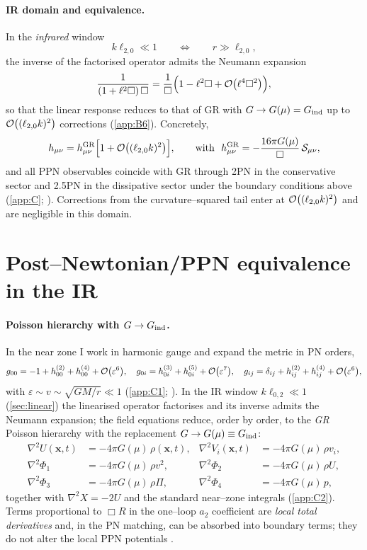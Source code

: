 \documentclass{iopjournal}
\begin{document}
\paragraph{IR domain and equivalence.}
In the \emph{infrared} window
\begin{equation}
k\ell_{2,0}\ll1\qquad\Longleftrightarrow\qquad r\gg \ell_{2,0},
\label{eq:lin_IRwindow}
\end{equation}
the inverse of the factorised operator admits the Neumann expansion
\[
\frac{1}{(1+\ell^2\Box)\,\Box}=\frac{1}{\Box}\Big(1-\ell^2\Box+\order{\ell^4\Box^2}\Big),
\]
so that the linear response reduces to that of GR with $G\to G(\mu)=G_{\rm ind}$ up to $\order{(\ell_{2,0}k)^2}$ corrections (\cref{app:B6}). Concretely,
\begin{equation}
h_{\mu\nu}=h_{\mu\nu}^{\rm GR}\Big[1+\order{(\ell_{2,0}k)^2}\Big],\qquad
\text{with}\ \ h_{\mu\nu}^{\rm GR}=-\frac{16\pi G(\mu)}{\Box}\,\mathcal S_{\mu\nu},
\label{eq:lin_equivalence}
\end{equation}
and all PPN observables coincide with GR through 2PN in the conservative sector and 2.5PN in the dissipative sector under the boundary conditions above (\cref{app:C}; \cite{PoissonWill2014,Will2014LRR,Blanchet2014LRR}). Corrections from the curvature–squared tail enter at $\order{(\ell_{2,0}k)^2}$ and are negligible in this domain.

\section{Post–Newtonian/PPN equivalence in the IR}\label{sec:ppn}
\paragraph{Poisson hierarchy with $G\to G_{\rm ind}$.}
In the near zone I work in harmonic gauge and expand the metric in PN orders,
\[
g_{00}=-1+h_{00}^{(2)}+h_{00}^{(4)}+\order{\varepsilon^{6}},\quad
g_{0i}=h_{0i}^{(3)}+h_{0i}^{(5)}+\order{\varepsilon^{7}},\quad
g_{ij}=\delta_{ij}+h_{ij}^{(2)}+h_{ij}^{(4)}+\order{\varepsilon^{6}},
\]
with $\varepsilon\sim v\sim\sqrt{GM/r}\ll1$ (\cref{app:C1}; \cite{PoissonWill2014,Blanchet2014LRR}). In the IR window $k\ell_{0,2}\ll1$ (\cref{sec:linear}) the linearised operator factorises and its inverse admits the Neumann expansion; the field equations reduce, order by order, to the \emph{GR} Poisson hierarchy with the replacement $G\to G(\mu)\equiv G_{\rm ind}$:
\begin{align}
\nabla^2 U(\boldsymbol x,t)&=-4\pi G(\mu)\,\rho(\boldsymbol x,t), &
\nabla^2 V_i(\boldsymbol x,t)&=-4\pi G(\mu)\,\rho v_i, \label{eq:ppn_Poisson1}\\
\nabla^2 \Phi_1&=-4\pi G(\mu)\,\rho v^2, &
\nabla^2 \Phi_2&=-4\pi G(\mu)\,\rho U, \\
\nabla^2 \Phi_3&=-4\pi G(\mu)\,\rho \Pi, &
\nabla^2 \Phi_4&=-4\pi G(\mu)\,p, \label{eq:ppn_Poisson2}
\end{align}
together with $\nabla^2 X=-2U$ and the standard near–zone integrals (\cref{app:C2}). Terms proportional to $\Box R$ in the one–loop $a_2$ coefficient are \emph{local total derivatives} and, in the PN matching, can be absorbed into boundary terms; they do not alter the local PPN potentials \cite{ParkerToms,Vassilevich2003}.
\end{document}
